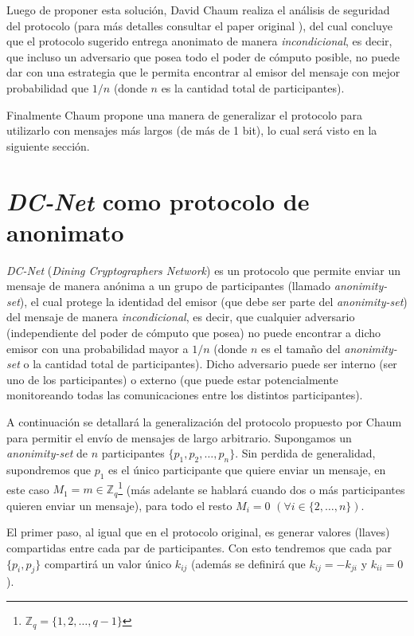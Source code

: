 
Luego de proponer esta solución, David Chaum realiza el análisis de seguridad del protocolo (para más detalles consultar el paper original 
\cite{chaum1988dining}), del cual concluye que el protocolo sugerido entrega anonimato de manera \emph{incondicional}, es decir, que incluso 
un adversario que posea todo el poder de cómputo posible, no puede dar con una estrategia que le permita encontrar al emisor del mensaje 
con mejor probabilidad que $1/n$ (donde $n$ es la cantidad total de participantes).

Finalmente Chaum propone una manera de generalizar el protocolo para utilizarlo con mensajes más largos (de más de 1 bit), lo cual será 
visto en la siguiente sección.

\section{\emph{DC-Net} como protocolo de anonimato}

\emph{DC-Net} (\emph{Dining Cryptographers Network}) es un protocolo que permite enviar un mensaje de manera anónima a un grupo de participantes 
(llamado \emph{anonimity-set}), el cual protege la identidad del emisor (que debe ser parte del \emph{anonimity-set}) del mensaje de manera 
\emph{incondicional}, es decir, que cualquier adversario (independiente del poder de cómputo que posea) no puede encontrar a dicho emisor con 
una probabilidad mayor a $1/n$ (donde $n$ es el tamaño del \emph{anonimity-set} o la cantidad total de participantes). Dicho adversario puede 
ser interno (ser uno de los participantes) o externo (que puede estar potencialmente monitoreando todas las comunicaciones entre los distintos participantes).

A continuación se detallará la generalización del protocolo propuesto por Chaum para permitir el envío de mensajes de largo arbitrario. 
Supongamos un \emph{anonimity-set} de $n$ participantes $\{p_1, p_2, \ldots, p_n\}$. Sin perdida de generalidad, supondremos que $p_1$ es el único 
participante que quiere enviar un mensaje, en este caso $M_1 = m \in \mathbb{Z}_q$\footnote{$\mathbb{Z}_q = \{1, 2, \ldots, q - 1\}$} (más adelante 
se hablará cuando dos o más participantes quieren enviar un mensaje), para todo el resto $M_i = 0$ $(\forall i \in \{2, \ldots, n\})$.

El primer paso, al igual que en el protocolo original, es generar valores (llaves) compartidas entre cada par de participantes. Con esto 
tendremos que cada par $\{p_i, p_j\}$ compartirá un valor único $k_{ij}$ (además se definirá que $k_{ij} = -k_{ji}$ y $k_{ii} = 0$).

